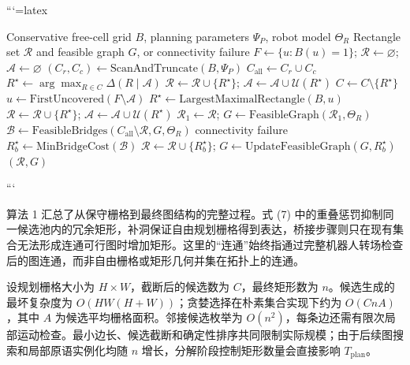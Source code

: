 ```{=latex}
\begin{algorithm}[H]
\caption{Rectangle segmentation and connectivity completion}
\label{alg:segmentation}
\small
\begin{algorithmic}[1]
\Require Conservative free-cell grid $B$, planning parameters $\Psi_P$, robot model $\Theta_R$
\Ensure Rectangle set $\mathcal R$ and feasible graph $G$, or connectivity failure
\State $F\gets\{u:B(u)=1\}$; $\mathcal R\gets\varnothing$; $\mathcal A\gets\varnothing$
\State $(C_r,C_c)\gets\mathrm{ScanAndTruncate}(B,\Psi_P)$
\State $C_{\mathrm{all}}\gets C_r\cup C_c$
    \State $R^\star\gets\arg\max_{R\in C}\Delta(R\mid\mathcal A)$ 
    \State $\mathcal R\gets\mathcal R\cup\{R^\star\}$; $\mathcal A\gets\mathcal A\cup\mathcal U(R^\star)$
    \State $C\gets C\setminus\{R^\star\}$
  \EndWhile
\EndFor
{}
  \State $u\gets\mathrm{FirstUncovered}(F\setminus\mathcal A)$
  \State $R^\star\gets\mathrm{LargestMaximalRectangle}(B,u)$ 
  \State $\mathcal R\gets\mathcal R\cup\{R^\star\}$; $\mathcal A\gets\mathcal A\cup\mathcal U(R^\star)$
\EndWhile
\State $\mathcal R_1\gets\mathcal R$; $G\gets\mathrm{FeasibleGraph}(\mathcal R_1,\Theta_R)$
  \State $\mathcal B\gets\mathrm{FeasibleBridges}(C_{\mathrm{all}}\setminus\mathcal R,G,\Theta_R)$
    \State \Return connectivity failure
  \EndIf
  \State $R_b^\star\gets\mathrm{MinBridgeCost}(\mathcal B)$ 
  \State $\mathcal R\gets\mathcal R\cup\{R_b^\star\}$; $G\gets\mathrm{UpdateFeasibleGraph}(G,R_b^\star)$
\EndWhile
\State \Return $(\mathcal R,G)$
\end{algorithmic}
\end{algorithm}
```

  

算法 1 汇总了从保守栅格到最终图结构的完整过程。式 (7) 中的重叠惩罚抑制同一候选池内的冗余矩形，补洞保证自由规划栅格得到表达，桥接步骤则只在现有集合无法形成连通可行图时增加矩形。这里的“连通”始终指通过完整机器人转场检查后的图连通，而非自由栅格或矩形几何并集在拓扑上的连通。

  

设规划栅格大小为 $H\times W$，截断后的候选数为 $C$，最终矩形数为 $n$。候选生成的最坏复杂度为 $O(HW(H+W))$；贪婪选择在朴素集合实现下约为 $O(CnA)$，其中 $A$ 为候选平均栅格面积。邻接候选枚举为 $O(n^2)$，每条边还需有限次局部运动检查。最小边长、候选截断和确定性排序共同限制实际规模；由于后续图搜索和局部原语实例化均随 $n$ 增长，分解阶段控制矩形数量会直接影响 $T_{\mathrm{plan}}$。
  

